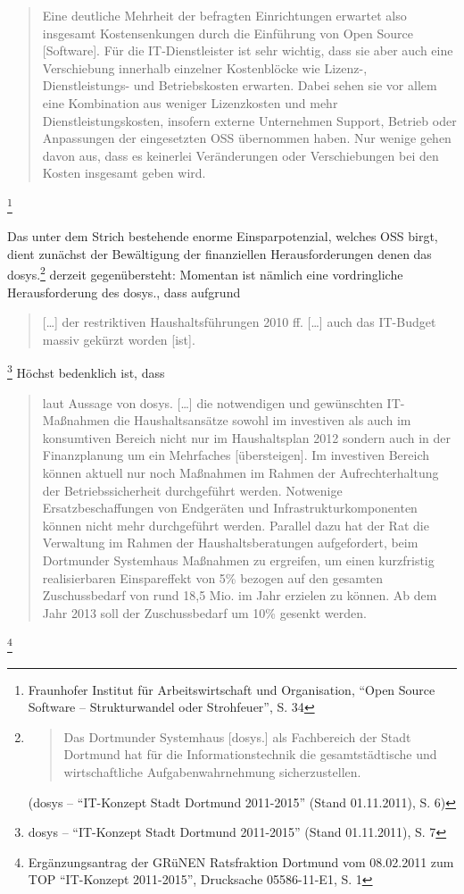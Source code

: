 \documentclass[a4paper]{scrartcl}
\begin{document}
\begin{quote}Eine deutliche Mehrheit der befragten Einrichtungen erwartet also
  insgesamt Kostensenkungen durch die Einführung von Open Source [Software]. Für
  die IT-Dienstleister ist sehr wichtig, dass sie aber auch eine Verschiebung
  innerhalb einzelner Kostenblöcke wie Lizenz-, Dienstleistungs- und
  Betriebskosten erwarten. Dabei sehen sie vor allem eine Kombination aus
  weniger Lizenzkosten und mehr Dienstleistungskosten, insofern externe
  Unternehmen Support, Betrieb oder Anpassungen der eingesetzten OSS übernommen
  haben. Nur wenige gehen davon aus, dass es keinerlei Veränderungen oder
  Verschiebungen bei den Kosten insgesamt geben wird.
\end{quote}\footnote{Fraunhofer Institut für Arbeitswirtschaft und Organisation,
  ``Open Source Software -- Strukturwandel oder Strohfeuer'', S. 34}

Das unter dem Strich bestehende enorme Einsparpotenzial, welches OSS birgt,
dient zunächst der Bewältigung der finanziellen Herausforderungen denen das
dosys.\footnote{\begin{quote}Das Dortmunder Systemhaus [dosys.] als Fachbereich
    der Stadt Dortmund hat für die Informationstechnik die gesamtstädtische und
    wirtschaftliche Aufgabenwahrnehmung sicherzustellen.\end{quote} (dosys -- ``IT-Konzept
  Stadt Dortmund 2011-2015'' (Stand 01.11.2011), S. 6)} derzeit gegenübersteht:
Momentan ist nämlich eine{ vordringliche Herausforderung des dosys., dass
  aufgrund }\begin{quote} [\ldots] der restriktiven Haushaltsführungen 2010
    ff. [\ldots] auch das IT-Budget massiv gekürzt worden
    [ist].\end{quote}\footnote{dosys -- ``IT-Konzept Stadt Dortmund 2011-2015''
    (Stand 01.11.2011), S. 7} Höchst bedenklich ist, dass
  \begin{quote}laut Aussage von dosys.  [\ldots] die notwendigen und gewünschten
    IT-Maßnahmen die Haushaltsansätze sowohl im investiven als auch im
    konsumtiven Bereich nicht nur im Haushaltsplan 2012 sondern auch in der
    Finanzplanung um ein Mehrfaches [übersteigen]. Im investiven Bereich können
    aktuell nur noch Maßnahmen im Rahmen der Aufrechterhaltung der
    Betriebssicherheit durchgeführt werden. Notwenige Ersatzbeschaffungen von
    Endgeräten und Infrastrukturkomponenten können nicht mehr durchgeführt
    werden. Parallel dazu hat der Rat die Verwaltung im Rahmen der
    Haushaltsberatungen aufgefordert, beim Dortmunder Systemhaus Maßnahmen zu
    ergreifen, um einen kurzfristig realisierbaren Einspareffekt von 5\% bezogen
    auf den gesamten Zuschussbedarf von rund 18,5 Mio. {\texteuro} im Jahr
    erzielen zu können. Ab dem Jahr 2013 soll der Zuschussbedarf um 10\% gesenkt
    werden.
\end{quote}\footnote{Ergänzungsantrag der GRüNEN Ratsfraktion
    Dortmund vom 08.02.2011 zum TOP ``IT-Konzept 2011-2015'', Drucksache
    05586-11-E1, S. 1}
\end{document}
